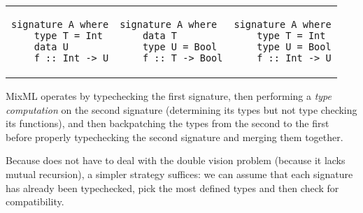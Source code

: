 \begin{tabular}{p{} p{} p{}}
\begin{verbatim}
signature A where
    type T = Int
    data U
    f :: Int -> U
\end{verbatim}
&
\begin{verbatim}
signature A where
    data T
    type U = Bool
    f :: T -> Bool
\end{verbatim}
&
\begin{verbatim}
signature A where
    type T = Int
    type U = Bool
    f :: Int -> U
\end{verbatim}
\end{tabular}
%
MixML operates by typechecking the first signature, then performing
a \emph{type computation} on the second signature (determining its types
but not type checking its functions), and then backpatching
the types from the second to the first before properly typechecking
the second signature and merging them together.

Because \Backpack{} does not have to deal with the double vision problem
(because it lacks mutual recursion), a simpler strategy suffices: we can
assume that each signature has already been typechecked, pick the most
defined types and then check for compatibility.




